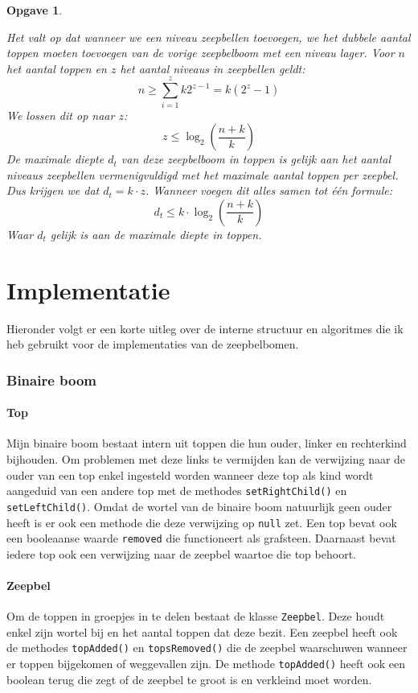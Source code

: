 \documentclass[12pt]{article}
\newtheorem{opgave}{Opgave}
\begin{document}
\begin{opgave}
\begin{enumerate}[a.]
\begin{center}
            \end{center}
            Het valt op dat wanneer we een niveau zeepbellen toevoegen, we het dubbele aantal toppen moeten toevoegen van de vorige zeepbelboom met een niveau lager. 
            Voor $n$ het aantal toppen en $z$ het aantal niveaus in zeepbellen geldt: $$n \ge \sum\limits_{i=1}^z k2^{z-1} = k(2^z-1)$$ 
            We lossen dit op naar $z$: $$z \le \log_2{(\dfrac{n+k}{k})}$$
            De maximale diepte $d_t$ van deze zeepbelboom in toppen is gelijk aan het aantal niveaus zeepbellen vermenigvuldigd met het maximale aantal toppen per zeepbel.
            Dus krijgen we dat $d_t=k\cdot z$.
            Wanneer voegen dit alles samen tot één formule:
            $$d_t \le k \cdot \log_2{(\dfrac{n+k}{k})}$$
            Waar $d_t$ gelijk is aan de maximale diepte in toppen.
    \endgroup 
\end{enumerate}
    \end{opgave}	
    \newpage
    \part*{Implementatie}
    Hieronder volgt er een korte uitleg over de interne structuur en algoritmes die
    ik heb gebruikt voor de implementaties van de zeepbelbomen.
    \section{Binaire boom}
    \subsection{Top}
    Mijn binaire boom bestaat intern uit toppen die hun ouder,  linker en
    rechterkind bijhouden. Om problemen met deze links te vermijden kan de verwijzing
    naar de ouder van een top enkel ingesteld worden wanneer deze top als kind wordt
    aangeduid van een andere top met de methodes {\tt setRightChild()} en {\tt setLeftChild()}. Omdat de wortel van de binaire boom natuurlijk geen
    ouder heeft is er ook een methode die deze verwijzing op {\tt null} zet.
    Een top bevat ook een booleaanse waarde {\tt removed} die functioneert als
    grafsteen. Daarnaast bevat iedere top ook een verwijzing naar de zeepbel waartoe die 
    top behoort.
    \subsection{Zeepbel}
    Om de toppen in groepjes in te delen bestaat de klasse {\tt Zeepbel}. Deze houdt
    enkel zijn wortel bij en het aantal toppen dat deze bezit. Een zeepbel heeft ook de
    methodes {\tt topAdded()} en {\tt topsRemoved()} die de zeepbel waarschuwen wanneer
    er toppen bijgekomen of weggevallen zijn. De methode {\tt topAdded()} heeft ook
    een boolean terug die zegt of de zeepbel te groot is en verkleind moet worden.
\end{document}

